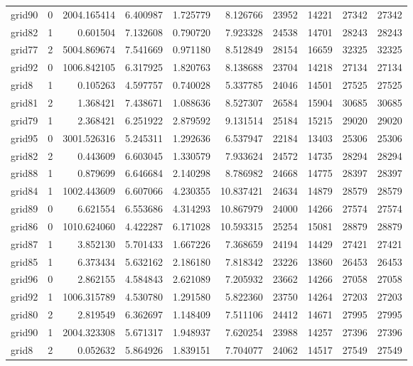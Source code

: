 \begin{longtable}{|l|r|r|r|r|r|r|r|r|r|}
grid90 & 0 & 2004.165414 & 6.400987 & 1.725779 & 8.126766 & 23952 & 14221 & 27342 & 27342 \\
grid82 & 1 & 0.601504 & 7.132608 & 0.790720 & 7.923328 & 24538 & 14701 & 28243 & 28243 \\
grid77 & 2 & 5004.869674 & 7.541669 & 0.971180 & 8.512849 & 28154 & 16659 & 32325 & 32325 \\
grid92 & 0 & 1006.842105 & 6.317925 & 1.820763 & 8.138688 & 23704 & 14218 & 27134 & 27134 \\
grid8 & 1 & 0.105263 & 4.597757 & 0.740028 & 5.337785 & 24046 & 14501 & 27525 & 27525 \\
grid81 & 2 & 1.368421 & 7.438671 & 1.088636 & 8.527307 & 26584 & 15904 & 30685 & 30685 \\
grid79 & 1 & 2.368421 & 6.251922 & 2.879592 & 9.131514 & 25184 & 15215 & 29020 & 29020 \\
grid95 & 0 & 3001.526316 & 5.245311 & 1.292636 & 6.537947 & 22184 & 13403 & 25306 & 25306 \\
grid82 & 2 & 0.443609 & 6.603045 & 1.330579 & 7.933624 & 24572 & 14735 & 28294 & 28294 \\
grid88 & 1 & 0.879699 & 6.646684 & 2.140298 & 8.786982 & 24668 & 14775 & 28397 & 28397 \\
grid84 & 1 & 1002.443609 & 6.607066 & 4.230355 & 10.837421 & 24634 & 14879 & 28579 & 28579 \\
grid89 & 0 & 6.621554 & 6.553686 & 4.314293 & 10.867979 & 24000 & 14266 & 27574 & 27574 \\
grid86 & 0 & 1010.624060 & 4.422287 & 6.171028 & 10.593315 & 25254 & 15081 & 28879 & 28879 \\
grid87 & 1 & 3.852130 & 5.701433 & 1.667226 & 7.368659 & 24194 & 14429 & 27421 & 27421 \\
grid85 & 1 & 6.373434 & 5.632162 & 2.186180 & 7.818342 & 23226 & 13860 & 26453 & 26453 \\
grid96 & 0 & 2.862155 & 4.584843 & 2.621089 & 7.205932 & 23662 & 14266 & 27058 & 27058 \\
grid92 & 1 & 1006.315789 & 4.530780 & 1.291580 & 5.822360 & 23750 & 14264 & 27203 & 27203 \\
grid80 & 2 & 2.819549 & 6.362697 & 1.148409 & 7.511106 & 24412 & 14671 & 27995 & 27995 \\
grid90 & 1 & 2004.323308 & 5.671317 & 1.948937 & 7.620254 & 23988 & 14257 & 27396 & 27396 \\
grid8 & 2 & 0.052632 & 5.864926 & 1.839151 & 7.704077 & 24062 & 14517 & 27549 & 27549 \\

\end{longtable}
